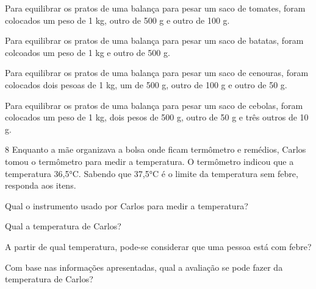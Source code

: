\begin{escolha}
\item
  Para equilibrar os pratos de uma balança para pesar um saco de tomates, foram colocados um peso de 1 kg, outro de 500 g e outro de 100 g.\\

\item
  Para equilibrar os pratos de uma balança para pesar um saco de batatas, foram colcoados um peso de 1 kg e outro de 500 g.\\

\item
  Para equilibrar os pratos de uma balança para pesar um saco de cenouras, foram colocados dois pesoas de 1 kg, um de 500 g, outro de 100 g e outro de 50 g.\\
 \enlargethispage{3\baselineskip}

\item
  Para equilibrar os pratos de uma balança para pesar um saco de cebolas, foram colocados um peso de 1 kg, dois pesos de 500 g, outro de 50 g e três outros de 10 g.\\
\end{escolha}

\num{8} Enquanto a mãe organizava a bolsa onde ficam termômetro e remédios, Carlos tomou o termômetro para medir a temperatura. O termômetro indicou que a temperatura 36,5°C. Sabendo que 37,5°C é o limite da temperatura sem febre, responda aos itens.

\begin{escolha} 
\item Qual o instrumento usado por Carlos para medir a temperatura?\\

\item Qual a temperatura de Carlos?\\

\item A partir de qual temperatura, pode-se considerar que uma pessoa está com febre?\\

\item Com base nas informações apresentadas, qual a avaliação se pode fazer da temperatura de Carlos?\\
\end{escolha}


